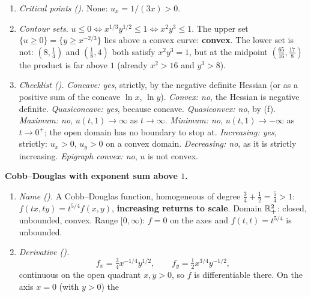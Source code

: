 \begin{solutions}
\begin{enumerate}[label=(\alph*),leftmargin=1.8em,itemsep=0.4ex]
{                definite} everywhere.
          \item \emph{Critical points ().} None: $u_{x}=1/(3x)>0$.
          \item \emph{Contour sets.} $u\le0\iff x^{1/3}y^{1/2}\le1\iff
                x^{2}y^{3}\le1$. The upper set $\{u\ge0\}=\{y\ge x^{-2/3}\}$
                lies above a convex curve: \textbf{convex}. The lower set is
                not: $(8,\tfrac14)$ and $(\tfrac18,4)$ both satisfy
                $x^{2}y^{3}=1$, but at the midpoint
                $(\tfrac{65}{16},\tfrac{17}{8})$ the product is far above
                $1$ (already $x^{2}>16$ and $y^{3}>8$).
          \item \emph{Checklist ().}
                \emph{Concave: yes}, strictly, by the negative definite
                Hessian (or as a positive sum of the concave $\ln x$,
                $\ln y$).
                \emph{Convex: no}, the Hessian is negative definite.
                \emph{Quasiconcave: yes}, because concave.
                \emph{Quasiconvex: no}, by (f).
                \emph{Maximum: no}, $u(t,1)\to\infty$ as $t\to\infty$.
                \emph{Minimum: no}, $u(t,1)\to-\infty$ as $t\to0^{+}$; the
                open domain has no boundary to stop at.
                \emph{Increasing: yes}, strictly: $u_{x}>0$, $u_{y}>0$ on a
                convex domain.
                \emph{Decreasing: no}, as it is strictly increasing.
                \emph{Epigraph convex: no}, $u$ is not convex.
        \end{enumerate}
  \item \textbf{Cobb--Douglas with exponent sum above $1$.}
        \begin{enumerate}[label=(\alph*),leftmargin=1.8em,itemsep=0.4ex]
          \item \emph{Name ().} A Cobb--Douglas function,
                homogeneous of degree $\tfrac34+\tfrac12=\tfrac54>1$:
                $f(tx,ty)=t^{5/4}f(x,y)$, \textbf{increasing returns to
                scale}. Domain $\mathbb{R}^{2}_{+}$: closed, unbounded, convex.
                Range $[0,\infty)$: $f=0$ on the axes and $f(t,t)=t^{5/4}$
                is unbounded.
          \item \emph{Derivative ().}
                \[
                  f_{x}=\tfrac34x^{-1/4}y^{1/2},\qquad
                  f_{y}=\tfrac12x^{3/4}y^{-1/2},
                \]
                continuous on the open quadrant $x,y>0$, so $f$ is
                differentiable there. On the axis $x=0$ (with $y>0$) the

\end{enumerate}
\end{solutions}

